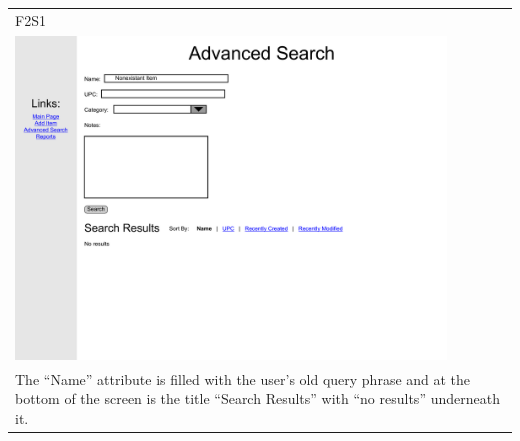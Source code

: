 \documentclass{article}
\begin{document}
~\\
~\\
\begin{tabular}{ p{4.5in} }
F2S1\\
\includegraphics[keepaspectratio, width=4.5in]{basicSearchF2S1.pdf} \\
The ``Name'' attribute is filled with the user's old query phrase and at the bottom of the screen is the title ``Search Results'' with ``no results'' underneath it.
\end{tabular}
\end{document}
